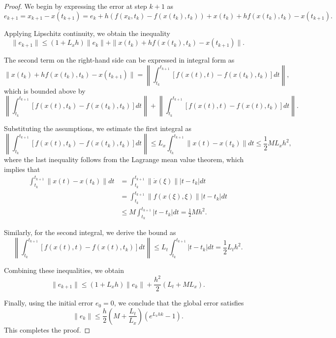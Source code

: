 \documentclass[10pt,a4paper]{amsart}
\begin{document}
\begin{proof}
    We begin by expressing the error at step $ k+1 $ as
    \[
    e_{k+1} = x_{k+1} - x(t_{k+1}) = e_k + h \left( f(x_k, t_k) - f(x(t_k), t_k) \right) + x(t_k) + h f(x(t_k), t_k) - x(t_{k+1}).
    \]

    Applying Lipschitz continuity, we obtain the inequality
    \[
    \|e_{k+1}\| \leq (1 + L_x h) \|e_k\| + \|x(t_k) + h f(x(t_k), t_k) - x(t_{k+1})\|.
    \]

    The second term on the right-hand side can be expressed in integral form as
    \[
    \|x(t_k) + h f(x(t_k), t_k) - x(t_{k+1})\| = \left\| \int_{t_k}^{t_{k+1}} \left[ f(x(t), t) - f(x(t_k), t_k) \right] dt \right\|,
    \]
    which is bounded above by
    \[
    \left\| \int_{t_k}^{t_{k+1}} \left[ f(x(t), t_k) - f(x(t_k), t_k) \right] dt \right\| + \left\| \int_{t_k}^{t_{k+1}} \left[ f(x(t), t) - f(x(t), t_k) \right] dt \right\|.
    \]

    Substituting the assumptions, we estimate the first integral as 
    \[
    \left\| \int_{t_k}^{t_{k+1}} \left[ f(x(t), t_k) - f(x(t_k), t_k) \right] dt \right\| \leq L_x \int_{t_k}^{t_{k+1}} \|x(t) - x(t_k)\| dt \leq \frac{1}{2} M L_x h^2,
    \]
    where the last inequality follows from the Lagrange mean value theorem, which implies that 
    \begin{align*}
    \int_{t_k}^{t_{k+1}} \|x(t) - x(t_k)\| dt 
    &= \int_{t_k}^{t_{k+1}} \|\dot{x}(\xi)\| |t - t_k| dt \\
    &= \int_{t_k}^{t_{k+1}} \|f(x(\xi), \xi)\| |t - t_k| dt \\
    &\leq M \int_{t_k}^{t_{k+1}} |t - t_k| dt = \frac{1}{2} M h^2.
    \end{align*}

    Similarly, for the second integral, we derive the bound as
    \[
    \left\| \int_{t_k}^{t_{k+1}} \left[ f(x(t), t) - f(x(t), t_k) \right] dt \right\| \leq L_t \int_{t_k}^{t_{k+1}} |t - t_k| dt = \frac{1}{2} L_t h^2.
    \]

    Combining these inequalities, we obtain
    \[
    \|e_{k+1}\| \leq (1 + L_x h) \|e_k\| + \frac{h^2}{2} (L_t + M L_x).
    \]

    Finally, using the initial error $ e_0 = 0 $, we conclude that the global error satisfies 
    \[
    \|e_k\| \leq \frac{h}{2} \left( M + \frac{L_t}{L_x} \right) \left( e^{L_x h k} - 1 \right).
    \]
    This completes the proof.
\end{proof}
\end{document}
